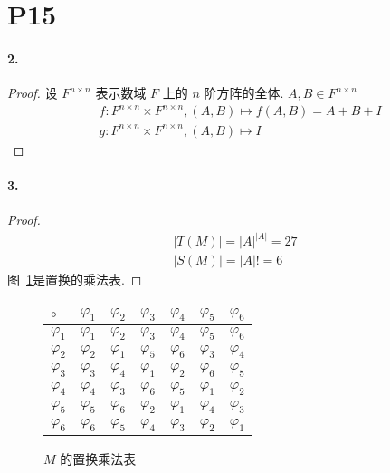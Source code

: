 \documentclass[12pt]{ctexart}
\theoremstyle{definition}
\theoremstyle{definition}
\theoremstyle{plain}
\theoremstyle{remark}
\begin{document}
\section*{P15}\label{sec:p15}
\paragraph{2. } 
\begin{proof}
	设 \(F^{n\times n}\) 表示数域 \(F\) 上的 \(n\) 阶方阵的全体. \(A , B \in F ^{n \times n}\)
	\begin{align}
		& f\colon F^{n \times n} \times F ^{n \times n} , (A, B) \mapsto f(A,B) = A + B + I  \\
		& g \colon F^{n \times n} \times F ^{n \times n} , (A, B) \mapsto I
	\end{align}
\end{proof}
\paragraph{3. } 
\begin{proof}
	\begin{align}
		|T (M) | = |A| ^{|A|} = 27 \\
		|S (M) | = |A|! = 6
	\end{align}
	图~\ref{tab:m}是置换的乘法表. 
\end{proof}

\begin{figure}
	\centering
\begin{tabular}{|l|l|l|l|l|l|l|} \hline
$\circ$ & 	    $\varphi_1$ & \(\varphi _{2}\) & \(\varphi _{3}\) & \(\varphi _{4}\) & \(\varphi _{5}\) & \(\varphi _{6}\) \\ \hline 
 \(\varphi _{1}\)   & \(\varphi _{1}\) & \(\varphi _{2}\) & \(\varphi _{3}\) & \(\varphi _{4}\) & \(\varphi _{5}\) & \(\varphi _{6}\) \\ \hline
 \(\varphi _{2}\)   &\(\varphi _{2}\)  &\(\varphi _{1}\)  &\(\varphi _{5}\)  &\(\varphi _{6}\)  &\(\varphi _{3}\)  &\(\varphi _{4}\)  \\ \hline 
 \(\varphi _{3}\)   &\(\varphi _{3}\)  &\(\varphi _{4}\)  &\(\varphi _{1}\)  &\(\varphi _{2}\)  &\(\varphi _{6}\)  &\(\varphi _{5}\)  \\\hline
 \(\varphi _{4}\)   &\(\varphi _{4}\)  &\(\varphi _{3}\)  &\(\varphi _{6}\)  &\(\varphi _{5}\)  &\(\varphi _{1}\)  &\(\varphi _{2}\)  \\\hline
 \(\varphi _{5}\)   &\(\varphi _{5}\)  &\(\varphi _{6}\)  &\(\varphi _{2}\)  &\(\varphi _{1}\)  &\(\varphi _{4}\)  &\(\varphi _{3}\)  \\\hline
 \(\varphi _{6}\)   &\(\varphi _{6}\)  &\(\varphi _{5}\)  &\(\varphi _{4}\)  &\(\varphi _{3}\)  &\(\varphi _{2}\)  &\(\varphi _{1}\) \\
\hline
\end{tabular}
	\caption{ \(M\) 的置换乘法表}\label{tab:m}
\end{figure}
\end{document}
